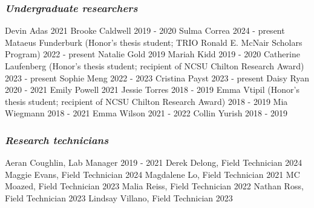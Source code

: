 \documentclass[11pt,english]{article}\usepackage[]{graphicx}\usepackage[]{xcolor}
\begin{document}
\subsubsection*{\emph{Undergraduate researchers}}
Devin Adas \hfill {2021} \newline
Brooke Caldwell \hfill {2019 - 2020} \newline
Sulma Correa \hfill {2024 - present} \newline 
Mataeus Funderburk (Honor's thesis student; TRIO Ronald E. McNair Scholars Program) \hfill {2022 - present} \newline
Natalie Gold \hfill {2019} \newline
Mariah Kidd \hfill {2019 - 2020} \newline
Catherine Laufenberg (Honor's thesis student; recipient of NCSU Chilton Research Award) \hfill {2023 - present} \newline 
Sophie Meng \hfill {2022 - 2023} \newline 
Cristina Payst \hfill {2023 - present} \newline 
Daisy Ryan \hfill {2020 - 2021} \newline 
Emily Powell \hfill {2021} \newline 
Jessie Torres \hfill {2018 - 2019} \newline
Emma Vtipil (Honor's thesis student; recipient of NCSU Chilton Research Award) \hfill {2018 - 2019} \newline
Mia Wiegmann \hfill {2018 - 2021} \newline 
Emma Wilson \hfill {2021 - 2022} \newline 
Collin Yurish \hfill {2018 - 2019} 

\subsubsection*{\emph{Research technicians}}
Aeran Coughlin, Lab Manager \hfill {2019 - 2021} \newline
Derek Delong, Field Technician \hfill {2024} \newline
Maggie Evans, Field Technician \hfill {2024} \newline
Magdalene Lo, Field Technician \hfill {2021} \newline
MC Moazed, Field Technician \hfill {2023} \newline
Malia Reiss, Field Technician \hfill {2022} \newline
Nathan Ross, Field Technician \hfill {2023} \newline
Lindsay Villano, Field Technician \hfill {2023}
\end{document}
